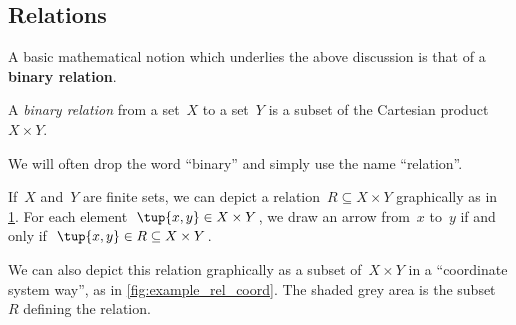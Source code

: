 \subsection{Relations}

A basic mathematical notion which underlies the above discussion is that of a \textbf{binary relation}.


\begin{definition}
A \emph{binary relation} from a set~$X$ to a set~$Y$ is a subset of the Cartesian product $X\times Y$.
\end{definition}

\begin{remark}
We will often drop the word ``binary'' and simply use the name ``relation''.
\end{remark}


If~$X$ and~$Y$ are finite sets, we can depict a relation~$R \subseteq X \times Y$ graphically as in \cref{fig:example_rel}. For each element~$\tup{x,y} \in X \times Y$, we draw an arrow from~$x$ to~$y$ if and only if~$\tup{x,y} \in R \subseteq X \times Y$.

\begin{figure}[h!]
\centering
{}
 \caption{}
\label{fig:example_rel}
\end{figure}

We can also depict this relation graphically as a subset of~$X \times Y$ in a ``coordinate system way'', as in \cref{fig:example_rel_coord}. The shaded grey area is the subset~$R$ defining the relation.

